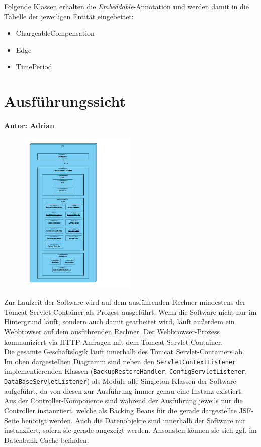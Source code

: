 \documentclass[fontsize=12pt,paper=a4,twoside]{scrartcl}
\begin{document}
Folgende Klassen erhalten die \textit{Embeddable}-Annotation und werden damit in die Tabelle der jeweiligen Entität eingebettet:
\begin{itemize}
\item ChargeableCompensation
\item Edge
\item TimePeriod
\end{itemize}

\clearpage


\section{Ausführungssicht}
\label{sec:ausfuehrung}
\textbf{Autor: Adrian}\\

\begin{figure}[H]
\centering
\includegraphics[width=0.5\textwidth]{ausfuehrung.pdf}
\end{figure}
Zur Laufzeit der Software wird auf dem ausführenden Rechner mindestens der Tomcat Servlet-Container als Prozess ausgeführt. Wenn die Software nicht nur im Hintergrund läuft, sondern auch damit gearbeitet wird, läuft außerdem ein Webbrowser auf dem ausführenden Rechner. Der Webbrowser-Prozess kommuniziert via HTTP-Anfragen mit dem Tomcat Servlet-Container.\\
Die gesamte Geschäftslogik läuft innerhalb des Tomcat Servlet-Containers ab. \\
Im oben dargestellten Diagramm sind neben den \texttt{ServletContextListener} implementierenden Klassen (\texttt{BackupRestoreHandler}, \texttt{ConfigServletListener}, \texttt{DataBaseServletListener}) als Module alle Singleton-Klassen der Software aufgeführt, da von diesen zur Ausführung immer genau eine Instanz existiert. \\
Aus der Controller-Komponente sind während der Ausführung jeweils nur die Controller instanziiert, welche als Backing Beans für die gerade dargestellte JSF-Seite benötigt werden. Auch die Datenobjekte sind innerhalb der Software nur instanziiert, sofern sie gerade angezeigt werden. Ansonsten können sie sich ggf. im Datenbank-Cache befinden.
\end{document}
